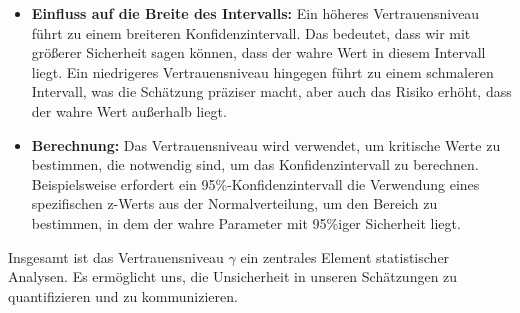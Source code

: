 \begin{itemize}
    \item \textbf{Einfluss auf die Breite des Intervalls:} Ein höheres Vertrauensniveau führt zu einem breiteren Konfidenzintervall. Das bedeutet, dass wir mit größerer Sicherheit sagen können, dass der wahre Wert in diesem Intervall liegt. Ein niedrigeres Vertrauensniveau hingegen führt zu einem schmaleren Intervall, was die Schätzung präziser macht, aber auch das Risiko erhöht, dass der wahre Wert außerhalb liegt.
    
    \item \textbf{Berechnung:} Das Vertrauensniveau wird verwendet, um kritische Werte zu bestimmen, die notwendig sind, um das Konfidenzintervall zu berechnen. Beispielsweise erfordert ein 95\%-Konfidenzintervall die Verwendung eines spezifischen z-Werts aus der Normalverteilung, um den Bereich zu bestimmen, in dem der wahre Parameter mit 95\%iger Sicherheit liegt.
\end{itemize}
Insgesamt ist das Vertrauensniveau \(\gamma\) ein zentrales Element statistischer Analysen. Es ermöglicht uns, die Unsicherheit in unseren Schätzungen zu quantifizieren und zu kommunizieren.
